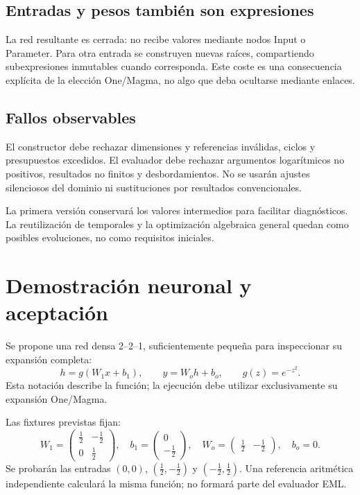 \documentclass[11pt,a4paper]{article}
\begin{document}
\subsection{Entradas y pesos también son expresiones}
La red resultante es cerrada: no recibe valores mediante nodos Input o
Parameter. Para otra entrada se construyen nuevas raíces, compartiendo
subexpresiones inmutables cuando corresponda. Este coste es una consecuencia
explícita de la elección One/Magma, no algo que deba ocultarse mediante enlaces.

\subsection{Fallos observables}
El constructor debe rechazar dimensiones y referencias inválidas, ciclos y
presupuestos excedidos. El evaluador debe rechazar argumentos logarítmicos
no positivos, resultados no finitos y desbordamientos. No se usarán ajustes
silenciosos del dominio ni sustituciones por resultados convencionales.

La primera versión conservará los valores intermedios para facilitar
diagnósticos. La reutilización de temporales y la optimización algebraica
general quedan como posibles evoluciones, no como requisitos iniciales.
\newpage

\section{Demostración neuronal y aceptación}
Se propone una red densa 2--2--1, suficientemente pequeña para inspeccionar
su expansión completa:
\[
 h=g(W_1x+b_1),\qquad y=W_oh+b_o,\qquad g(z)=e^{-z^2}.
\]
Esta notación describe la función; la ejecución debe utilizar exclusivamente
su expansión One/Magma.

\begin{center}
\end{center}

Las fixtures previstas fijan:
\[
 W_1=\begin{pmatrix}\frac12&-\frac12\\0&\frac12\end{pmatrix},\quad
 b_1=\begin{pmatrix}0\\-\frac12\end{pmatrix},\quad
 W_o=\begin{pmatrix}\frac12&-\frac12\end{pmatrix},\quad b_o=0.
\]
Se probarán las entradas \((0,0)\), \((\frac12,-\frac12)\) y
\((-\frac12,\frac12)\). Una referencia aritmética independiente calculará
la misma función; no formará parte del evaluador EML.
\end{document}
